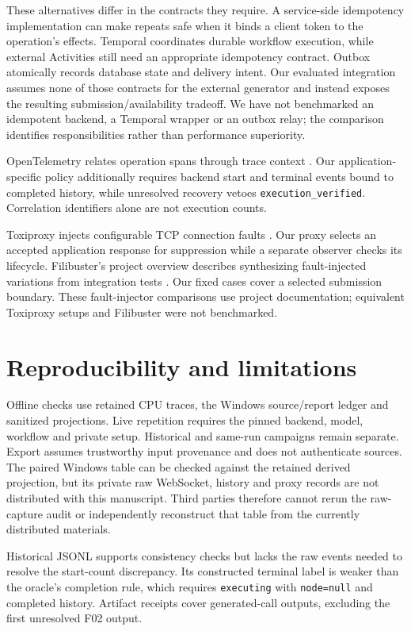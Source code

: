 \documentclass{ieeeaccess}
\begin{document}
These alternatives differ in the contracts they require. A service-side
idempotency implementation can make repeats safe when it binds a client token
to the operation's effects. Temporal coordinates durable workflow execution,
while external Activities still need an appropriate idempotency contract.
Outbox atomically records database state and delivery intent. Our evaluated
integration assumes none of those contracts for the external generator and
instead exposes the resulting submission/availability tradeoff. We have not
benchmarked an idempotent backend, a Temporal wrapper or an outbox relay; the
comparison identifies responsibilities rather than performance superiority.

OpenTelemetry relates operation spans through trace context \cite{otel}.
Our application-specific policy additionally requires backend start and terminal
events bound to completed history, while unresolved recovery vetoes
\texttt{execution\_verified}. Correlation identifiers alone are not execution counts.

Toxiproxy injects configurable TCP connection faults \cite{toxiproxy}. Our
proxy selects an accepted application response for suppression while a separate
observer checks its lifecycle. Filibuster's project overview describes
synthesizing fault-injected variations from integration tests \cite{filibuster}.
Our fixed cases cover a selected submission boundary. These fault-injector
comparisons use project documentation; equivalent Toxiproxy setups and
Filibuster were not benchmarked.

\section{Reproducibility and limitations}

Offline checks use retained CPU traces, the Windows source/report ledger and
sanitized projections. Live repetition requires the pinned backend, model,
workflow and private setup. Historical and same-run campaigns remain separate.
Export assumes trustworthy input provenance and does not authenticate sources.
The paired Windows table can be checked against the retained derived projection,
but its private raw WebSocket, history and proxy records are not distributed
with this manuscript. Third parties therefore cannot rerun the raw-capture
audit or independently reconstruct that table from the currently distributed
materials.

Historical JSONL supports consistency checks but lacks the raw events needed to
resolve the start-count discrepancy. Its constructed terminal label is weaker
than the oracle's completion rule, which requires \texttt{executing} with
\texttt{node=null} and completed history. Artifact receipts cover generated-call
outputs, excluding the first unresolved F02 output.
\end{document}
